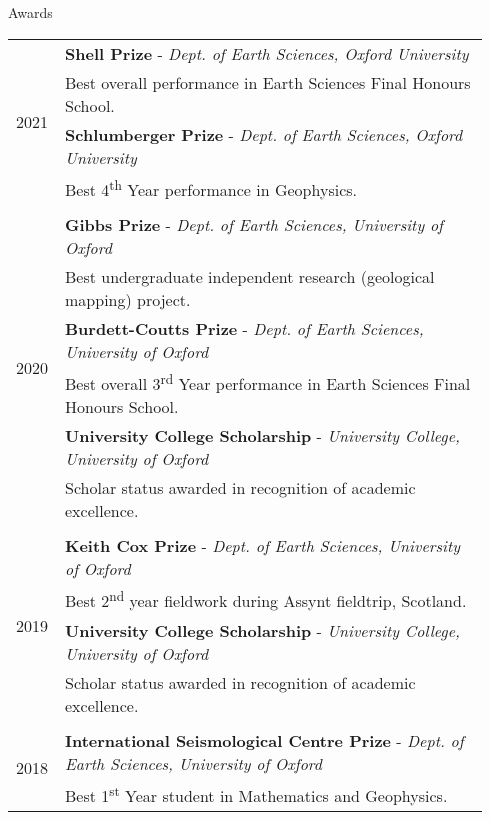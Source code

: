 \documentclass{resume}
\begin{document}
\vspace{0.2cm}
\begin{rSection}{Awards}

\begin{tabular}{p{0.07\linewidth} | p{0.87\linewidth}}
\multirow{4}{*}{2021}& \textbf{Shell Prize} - \textit{Dept. of Earth Sciences, Oxford University} \\  & \hspace{0.7cm} Best overall performance in Earth Sciences Final Honours School.  \\
&  \textbf{Schlumberger Prize} - \textit{Dept. of Earth Sciences, Oxford University} \\ &\hspace{0.7cm} Best 4\textsuperscript{th} Year performance in Geophysics. \\ 
\\
\multirow{6}{*}{2020}& \textbf{Gibbs Prize} - \textit{Dept. of Earth Sciences, University of Oxford} \\ & \hspace{0.7cm} Best undergraduate independent research (geological mapping) project. \\
& \textbf{Burdett-Coutts Prize} - \textit{Dept. of Earth Sciences, University of Oxford} \\ & \hspace{0.7cm} Best overall 3\textsuperscript{rd} Year performance in Earth Sciences Final Honours School. \\ 
& \textbf{University College Scholarship} - \textit{University College, University of Oxford} \\ & \hspace{0.7cm} Scholar status awarded in recognition of academic excellence. \\ 
\\
\multirow{4}{*}{2019}& \textbf{Keith Cox Prize} - \textit{Dept. of Earth Sciences, University of Oxford} \\ & \hspace{0.7cm}Best 2\textsuperscript{nd} year fieldwork during Assynt fieldtrip, Scotland. \\
& \textbf{University College Scholarship} - \textit{University College, University of Oxford} \\ & \hspace{0.7cm} Scholar status awarded in recognition of academic excellence. \\ 
\\
\multirow{2}{*}{2018} & \textbf{International Seismological Centre Prize } - \textit{Dept. of Earth Sciences, University of Oxford} \\ & \hspace{0.7cm} Best 1\textsuperscript{st} Year student in Mathematics and Geophysics.


\end{tabular}
\end{rSection}
\end{document}
